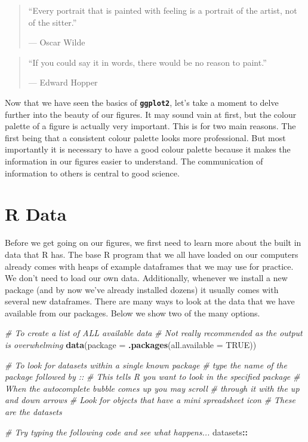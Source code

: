 \documentclass[
]{book}
\newenvironment{Shaded}{\begin{snugshade}}{\end{snugshade}}
\newcommand{\CommentTok}[1]{\textcolor[rgb]{0.56,0.35,0.01}{\textit{#1}}}
\newcommand{\DataTypeTok}[1]{\textcolor[rgb]{0.13,0.29,0.53}{#1}}
\newcommand{\KeywordTok}[1]{\textcolor[rgb]{0.13,0.29,0.53}{\textbf{#1}}}
\newcommand{\NormalTok}[1]{#1}
\newcommand{\OperatorTok}[1]{\textcolor[rgb]{0.81,0.36,0.00}{\textbf{#1}}}
\newcommand{\OtherTok}[1]{\textcolor[rgb]{0.56,0.35,0.01}{#1}}
\begin{document}
\begin{quote}
``Every portrait that is painted with feeling is a portrait of the artist, not of the sitter.''

--- Oscar Wilde
\end{quote}

\begin{quote}
``If you could say it in words, there would be no reason to paint.''

--- Edward Hopper
\end{quote}

Now that we have seen the basics of \textbf{\texttt{ggplot2}}, let's take a moment to delve further into the beauty of our figures. It may sound vain at first, but the colour palette of a figure is actually very important. This is for two main reasons. The first being that a consistent colour palette looks more professional. But most importantly it is necessary to have a good colour palette because it makes the information in our figures easier to understand. The communication of information to others is central to good science.

\hypertarget{r-data}{%
\section{R Data}\label{r-data}}

Before we get going on our figures, we first need to learn more about the built in data that R has. The base R program that we all have loaded on our computers already comes with heaps of example dataframes that we may use for practice. We don't need to load our own data. Additionally, whenever we install a new package (and by now we've already installed dozens) it usually comes with several new dataframes. There are many ways to look at the data that we have available from our packages. Below we show two of the many options.

\begin{Shaded}
\begin{Highlighting}[]
\CommentTok{\# To create a list of ALL available data}
  \CommentTok{\# Not really recommended as the output is overwhelming}
\KeywordTok{data}\NormalTok{(}\DataTypeTok{package =} \KeywordTok{.packages}\NormalTok{(}\DataTypeTok{all.available =} \OtherTok{TRUE}\NormalTok{))}

\CommentTok{\# To look for datasets within a single known package}
  \CommentTok{\# type the name of the package followed by \textquotesingle{}::\textquotesingle{}}
  \CommentTok{\# This tells R you want to look in the specified package}
  \CommentTok{\# When the autocomplete bubble comes up you may scroll}
  \CommentTok{\# through it with the up and down arrows}
  \CommentTok{\# Look for objects that have a mini spreadsheet icon}
  \CommentTok{\# These are the datasets}

\CommentTok{\# Try typing the following code and see what happens...}
\NormalTok{datasets}\OperatorTok{::}
\end{Highlighting}
\end{Shaded}
\end{document}
